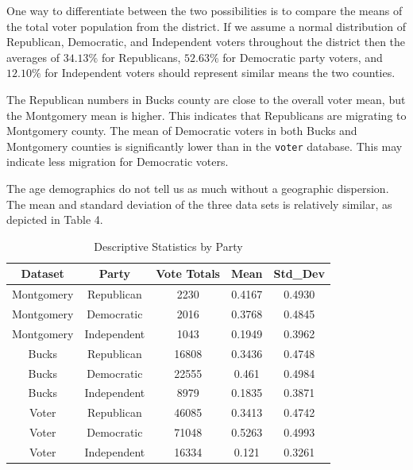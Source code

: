 \documentclass[]{article}
\begin{document}
One way to differentiate between the two possibilities is to compare the
means of the total voter population from the district. If we assume a
normal distribution of Republican, Democratic, and Independent voters
throughout the district then the averages of \(34.13\%\) for
Republicans, \(52.63\%\) for Democratic party voters, and \(12.10\%\)
for Independent voters should represent similar means the two counties.

The Republican numbers in Bucks county are close to the overall voter
mean, but the Montgomery mean is higher. This indicates that Republicans
are migrating to Montgomery county. The mean of Democratic voters in
both Bucks and Montgomery counties is significantly lower than in the
\texttt{voter} database. This may indicate less migration for Democratic
voters.

The age demographics do not tell us as much without a geographic
dispersion. The mean and standard deviation of the three data sets is
relatively similar, as depicted in Table 4.

\begin{table}[]
\centering
\caption{Descriptive Statistics by Party}
\label{my-label}
\begin{tabular}{ccccc}
Dataset    & Party       & Vote Totals & Mean   & Std\_Dev \\ \hline
Montgomery & Republican  & 2230         & 0.4167 & 0.4930    \\
Montgomery & Democratic  & 2016         & 0.3768 & 0.4845   \\
Montgomery & Independent & 1043         & 0.1949 & 0.3962   \\ \hline
Bucks      & Republican  & 16808        & 0.3436 & 0.4748   \\
Bucks      & Democratic  & 22555        & 0.461  & 0.4984   \\
Bucks      & Independent & 8979         & 0.1835 & 0.3871   \\ \hline
Voter      & Republican  & 46085        & 0.3413 & 0.4742   \\
Voter      & Democratic  & 71048        & 0.5263 & 0.4993   \\
Voter      & Independent & 16334        & 0.121  & 0.3261  \\ \hline \hline
\end{tabular}
\end{table}
\end{document}
